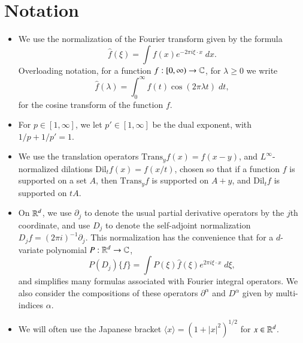
\chapter*{Notation}

\begin{itemize}
    \item We use the normalization of the Fourier transform given by the formula
    \[ \widehat{f}(\xi) = \int f(x) e^{- 2 \pi i \xi \cdot x}\; dx. \]
    Overloading notation, for a function $f: [0,\infty) \to \operatorname{\mathbb{C}}$, for $\lambda \geq 0$ we write
    \[ \widehat{f}(\lambda) = \int_0^\infty f(t) \cos(2 \pi \lambda t)\; dt, \]
    for the cosine transform of the function $f$.

    \item For $p \in [1,\infty]$, we let $p' \in [1,\infty]$ be the dual exponent, with $1/p + 1/p' = 1$.

    \item We use the translation operators $\text{Trans}_y f(x) = f(x - y)$, and $L^\infty$-normalized dilations $\text{Dil}_t f(x) = f(x/t)$, chosen so that if a function $f$ is supported on a set $A$, then $\text{Trans}_y f$ is supported on $A + y$, and $\text{Dil}_t f$ is supported on $tA$. %

    \item On $\operatorname{\mathbb{R}}^d$, we use $\partial_j$ to denote the usual partial derivative operators by the $j$th coordinate, and use $D_j$ to denote the self-adjoint normalization $D_j f = (2 \pi i)^{-1} \partial_j$. This normalization has the convenience that for a $d$-variate polynomial $P: \operatorname{\mathbb{R}}^d \to \operatorname{\mathbb{C}}$,
    \[ P(D_j) \{ f \} = \int P(\xi) \widehat{f}(\xi) e^{2 \pi i \xi \cdot x}\; d\xi, \]
    and simplifies many formulas associated with Fourier integral operators. We also consider the compositions of these operators $\partial^\alpha$ and $D^\alpha$ given by multi-indices $\alpha$.

    \item We will often use the Japanese bracket $\langle x \rangle = (1 + |x|^2)^{1/2}$ for $x \in \operatorname{\mathbb{R}}^d$.


\end{itemize}
